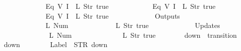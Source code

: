 \begin{isabellebody}
\ \ \ \ \ \ \ \ \ \ \ \ {\isacharparenleft}Eq\ {\isacharparenleft}V\ {\isacharparenleft}I\ {}{\isacharparenright}{\isacharparenright}\ {\isacharparenleft}L\ {\isacharparenleft}Str\ {\isacharprime}{\isacharprime}true{\isacharprime}{\isacharprime}{\isacharparenright}{\isacharparenright}{\isacharparenright}{\isacharcomma}\isanewline
\ \ \ \ \ \ \ \ \ \ \ \ {\isacharparenleft}Eq\ {\isacharparenleft}V\ {\isacharparenleft}I\ {}{\isacharparenright}{\isacharparenright}\ {\isacharparenleft}L\ {\isacharparenleft}Str\ {\isacharprime}{\isacharprime}true{\isacharprime}{\isacharprime}{\isacharparenright}{\isacharparenright}{\isacharparenright}{\isacharcomma}\isanewline
\ \ \ \ \ \ \ \ \ \ \ \ {\isacharparenleft}Eq\ {\isacharparenleft}V\ {\isacharparenleft}I\ {}{\isacharparenright}{\isacharparenright}\ {\isacharparenleft}L\ {\isacharparenleft}Str\ {\isacharprime}{\isacharprime}true{\isacharprime}{\isacharprime}{\isacharparenright}{\isacharparenright}{\isacharparenright}\isanewline
\ \ \ \ \ \ {\isacharbrackright}{\isacharcomma}\isanewline
\ \ \ \ \ \ Outputs\ {\isacharequal}\ {\isacharbrackleft}\isanewline
\ \ \ \ \ \ \ \ \ \ \ \ {\isacharparenleft}L\ {\isacharparenleft}Num\ {}{\isacharparenright}{\isacharparenright}{\isacharcomma}\isanewline
\ \ \ \ \ \ \ \ \ \ \ \ {\isacharparenleft}L\ {\isacharparenleft}Str\ {\isacharprime}{\isacharprime}true{\isacharprime}{\isacharprime}{\isacharparenright}{\isacharparenright}\isanewline
\ \ \ \ \ \ {\isacharbrackright}{\isacharcomma}\isanewline
\ \ \ \ \ \ Updates\ {\isacharequal}\ {\isacharbrackleft}\isanewline
\ \ \ \ \ \ \ \ \ \ \ \ {\isacharparenleft}{}{\isacharcomma}\ {\isacharparenleft}L\ {\isacharparenleft}Num\ {}{\isacharparenright}{\isacharparenright}{\isacharparenright}{\isacharcomma}\isanewline
\ \ \ \ \ \ \ \ \ \ \ \ {\isacharparenleft}{}{\isacharcomma}\ {\isacharparenleft}L\ {\isacharparenleft}Str\ {\isacharprime}{\isacharprime}true{\isacharprime}{\isacharprime}{\isacharparenright}{\isacharparenright}{\isacharparenright}\isanewline
\ \ \ \ \ \ {\isacharbrackright}\isanewline
{\isasymrparr}{\isachardoublequoteclose}\isanewline
\isanewline
{}\isamarkupfalse%
\ {\isachardoublequoteopen}down{}{}{\isachardoublequoteclose}\ {\isacharcolon}{\isacharcolon}\ {\isachardoublequoteopen}transition{\isachardoublequoteclose}\ \isanewline
{\isachardoublequoteopen}down{}{}\ {\isasymequiv}\ {\isasymlparr}\isanewline
\ \ \ \ \ \ Label\ {\isacharequal}\ STR\ {\isacharprime}{\isacharprime}down{\isacharprime}{\isacharprime}{\isacharcomma}\isanewline

\end{isabellebody}

